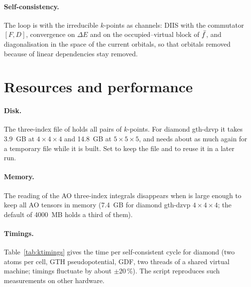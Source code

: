 \paragraph{Self-consistency.} The loop is  with the
irreducible $k$-points as channels: DIIS with the commutator $[F,D]$,
convergence on $\Delta E$ and on the occupied--virtual block of $\bar f$, and
diagonalisation in the space of the current orbitals, so that orbitals
removed because of linear dependencies stay removed.

\section{Resources and performance}
\label{sec:kpt-resources}

\paragraph{Disk.} The three-index file of \pyscf{} holds all pairs of
$k$-points. For diamond gth-dzvp it takes 3.9~GB at $4\times4\times4$ and
14.8~GB at $5\times5\times5$, and \pyscf{} needs about as much again for a
temporary file while it is built. Set  to
keep the file and  to reuse it in a later run.

\paragraph{Memory.} The reading of the AO three-index integrals disappears
when  is large enough to keep all AO tensors in memory (7.4~GB
for diamond gth-dzvp $4\times4\times4$; the default of 4000~MB holds a third of
them).

\paragraph{Timings.} Table~\ref{tab:ktimings} gives the time per
self-consistent cycle for diamond (two atoms per cell, GTH pseudopotential,
GDF, two threads of a shared virtual machine; timings fluctuate by about
$\pm20$\,\%). The script  reproduces such
measurements on other hardware.

